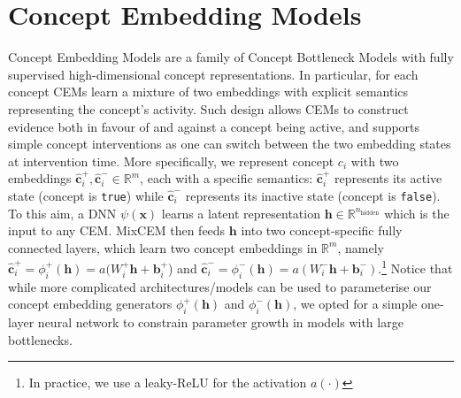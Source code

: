 \section{Concept Embedding Models} \label{sec:cem}
Concept Embedding Models are a family of Concept Bottleneck Models with fully supervised high-dimensional concept representations. In particular, for each concept CEMs learn a mixture of two embeddings with explicit semantics representing the concept's activity. Such design allows CEMs to construct evidence both in favour of and against a concept being active, and supports simple concept interventions as one can switch between the two embedding states at intervention time.
%
%
More specifically, we represent concept $c_i$ with two embeddings $\hat{\textbf{c}}^+_i, \hat{\textbf{c}}^-_i \in \mathbb{R}^m$, each with a specific semantics: $\hat{\textbf{c}}^+_i$ represents its active state (concept is \texttt{true}) while $\hat{\textbf{c}}^-_i$ represents its inactive state (concept is \texttt{false}). To this aim, a DNN $\psi(\mathbf{x})$ learns a latent representation $\mathbf{h} \in \mathbb{R}^{n_\text{hidden}}$ which is the input to any CEM. 
MixCEM then feeds $\mathbf{h}$ into two concept-specific fully connected layers, which learn two concept embeddings in $\mathbb{R}^m$, namely $\hat{\mathbf{c}}^+_i = \phi^+_i(\mathbf{h}) = a(W^+_i\mathbf{h} + \mathbf{b}^+_i$) and $\hat{\mathbf{c}}^-_i = \phi^-_i(\mathbf{h}) = a(W^-_i\mathbf{h} + \mathbf{b}^-_i)$.\footnote{In practice, we use a leaky-ReLU for the activation $a(\cdot)$} Notice that while more complicated architectures/models can be used to parameterise our concept embedding generators $\phi^+_i(\mathbf{h})$ and $\phi^-_i(\mathbf{h})$, we opted for a simple one-layer neural network to constrain parameter growth in models with large bottlenecks.

